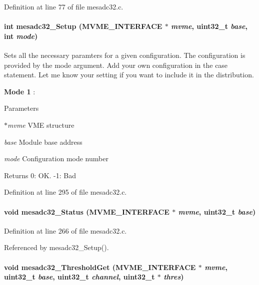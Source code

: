 Definition at line 77 of file mesadc32.c.
\paragraph[{mesadc32\_\-Setup}]{\setlength{\rightskip}{0pt plus 5cm}int mesadc32\_\-Setup ({\bf MVME\_\-INTERFACE} $\ast$ {\em mvme}, \/  uint32\_\-t {\em base}, \/  int {\em mode})}\hfill\label{mesadc32_8c_a3855ed86c6719a64b67b0e3ee8db64f7}
Sets all the necessary paramters for a given configuration. The configuration is provided by the mode argument. Add your own configuration in the case statement. Let me know your setting if you want to include it in the distribution.
\begin{DoxyItemize}
\item {\bfseries Mode 1} :
\end{DoxyItemize}


\begin{DoxyParams}{Parameters}
\item[{\em $\ast$mvme}]VME structure \item[{\em base}]Module base address \item[{\em mode}]Configuration mode number \end{DoxyParams}
\begin{DoxyReturn}{Returns}
0: OK. -\/1: Bad 
\end{DoxyReturn}


Definition at line 295 of file mesadc32.c.
\paragraph[{mesadc32\_\-Status}]{\setlength{\rightskip}{0pt plus 5cm}void mesadc32\_\-Status ({\bf MVME\_\-INTERFACE} $\ast$ {\em mvme}, \/  uint32\_\-t {\em base})}\hfill\label{mesadc32_8c_a2bca2bcd84593e46861a8a7ae452be9c}


Definition at line 266 of file mesadc32.c.

Referenced by mesadc32\_\-Setup().
\paragraph[{mesadc32\_\-ThresholdGet}]{\setlength{\rightskip}{0pt plus 5cm}void mesadc32\_\-ThresholdGet ({\bf MVME\_\-INTERFACE} $\ast$ {\em mvme}, \/  uint32\_\-t {\em base}, \/  uint32\_\-t {\em channel}, \/  uint32\_\-t $\ast$ {\em thres})}\hfill\label{mesadc32_8c_a7ebf33314f2367bf00111c35a6515174}


